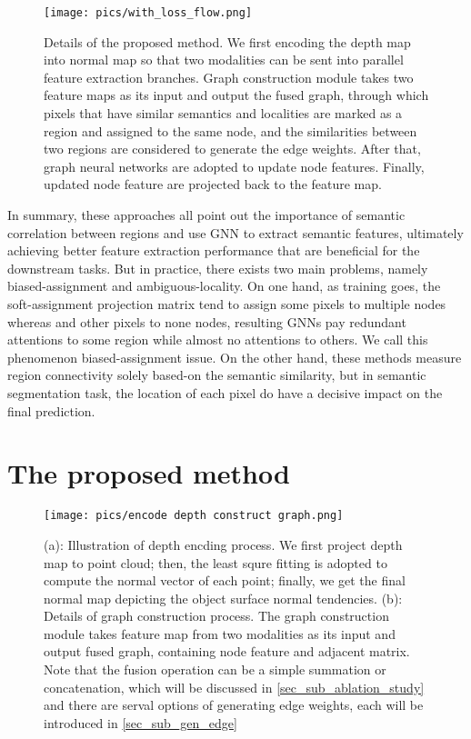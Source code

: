 \documentclass[journal]{IEEEtran}
\begin{document}
    \begin{figure*}
        \centering
        \texttt{[image: pics/with\_loss\_flow.png]}
        \caption{Details of the proposed method. We first encoding the depth map into normal map so that two modalities can be sent into parallel feature extraction branches. Graph construction module takes two feature maps as its input and output the fused graph, through which pixels that have similar semantics and localities are marked as a region and assigned to the same node, and the similarities between two regions are considered to generate the edge weights. After that, graph neural networks are adopted to update node features. Finally, updated node feature are projected back to the feature map. }
        \label{fig_overview}
    \end{figure*}
    
    In summary, these approaches all point out the importance of semantic correlation between regions and use GNN to extract semantic features, ultimately achieving better feature extraction performance that are beneficial for the downstream tasks. But in practice, there exists two main problems, namely biased-assignment and ambiguous-locality. On one hand, as training goes, the soft-assignment projection matrix tend to assign some pixels to multiple nodes whereas and other pixels to none nodes, resulting GNNs pay redundant attentions to some region while almost no attentions to others. We call this phenomenon biased-assignment issue. On the other hand, these methods measure region connectivity   solely based-on the semantic similarity, but in semantic segmentation task, the location of each pixel do have a decisive impact on the final prediction.  \\   

\section{The proposed method}  \label{sec_method}


\begin{figure*}
    \centering
    \texttt{[image: pics/encode depth construct graph.png]}
    \caption{(a): Illustration of depth encding process. We first project depth map to point cloud; then, the least squre fitting is adopted to compute the normal vector of each point; finally, we get the final normal map depicting the object surface normal tendencies. (b): Details of graph construction process. The graph construction module takes feature map from two modalities as its input and output fused graph, containing node feature and adjacent matrix. Note that the fusion operation can be a simple summation or concatenation, which will be discussed in \ref{sec_sub_ablation_study} and there are serval options of generating edge weights, each will be introduced in \ref{sec_sub_gen_edge} }
    \label{fig_depth_encoding_and_graph_construction}
\end{figure*}
\end{document}

